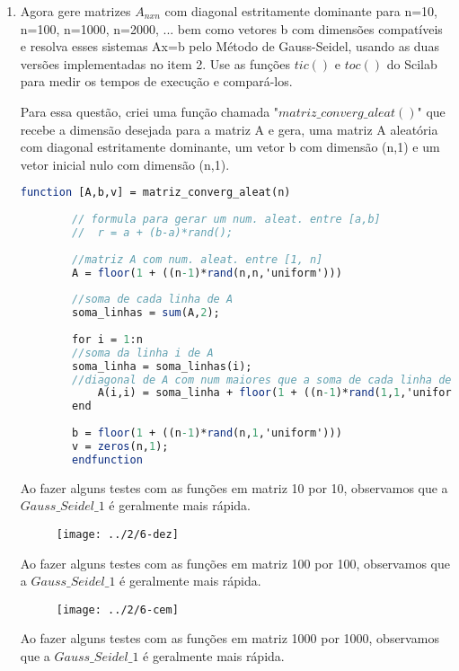 \documentclass[leqno]{article}
\numberwithin{equation}{section}
\begin{document}
\begin{enumerate}
		\item Agora gere matrizes $A_{nxn}$ com diagonal estritamente dominante
		para n=10, n=100, n=1000, n=2000, ... bem como vetores b com
		dimensões compatíveis e resolva esses sistemas Ax=b pelo
		Método de Gauss-Seidel, usando as duas versões implementadas
		no item 2. Use as funções $tic()$ e $toc()$ do Scilab para medir os
		tempos de execução e compará-los.
		
		\begin{sol}
			
		Para essa questão, criei uma função chamada "$matriz\_converg\_aleat()$" que recebe a dimensão desejada para a matriz A e gera, uma matriz A aleatória com diagonal estritamente dominante, um vetor b com dimensão (n,1) e um vetor inicial nulo com dimensão (n,1).	
		\begin{lstlisting}[language=Scilab]
		function [A,b,v] = matriz_converg_aleat(n)
		
		// formula para gerar um num. aleat. entre [a,b]
		//  r = a + (b-a)*rand();
		
		//matriz A com num. aleat. entre [1, n]
		A = floor(1 + ((n-1)*rand(n,n,'uniform')))
		
		//soma de cada linha de A
		soma_linhas = sum(A,2);
		
		for i = 1:n
		//soma da linha i de A
		soma_linha = soma_linhas(i);
		//diagonal de A com num maiores que a soma de cada linha de A.
			A(i,i) = soma_linha + floor(1 + ((n-1)*rand(1,1,'uniform')));
		end
		
		b = floor(1 + ((n-1)*rand(n,1,'uniform')))
		v = zeros(n,1);
		endfunction	
		\end{lstlisting}
	
		Ao fazer alguns testes com as funções em matriz 10 por 10, observamos que a $Gauss\_Seidel\_1$ é geralmente mais rápida.
	
		\begin{figure}[H]
			\centering
			\texttt{[image: ../2/6-dez]}
		\end{figure}
	
		Ao fazer alguns testes com as funções em matriz 100 por 100, observamos que a $Gauss\_Seidel\_1$ é geralmente mais rápida.
	
		\begin{figure}[H]
			\centering
			\texttt{[image: ../2/6-cem]}
		\end{figure}
	
		Ao fazer alguns testes com as funções em matriz 1000 por 1000, observamos que a $Gauss\_Seidel\_1$ é geralmente mais rápida.
		

\end{sol}
\end{enumerate}
\end{document}
